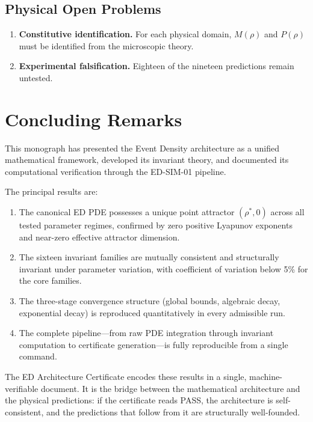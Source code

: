 \documentclass[11pt,twoside,openright]{book}
\theoremstyle{definition}
\theoremstyle{plain}
\theoremstyle{definition}
\theoremstyle{remark}
\newcommand{\rhostar}{\rho^{*}}
\begin{document}
\section{Physical Open Problems}

\begin{enumerate}[resume]
\item \textbf{Constitutive identification.} For each physical domain, \(M(\rho)\) and \(P(\rho)\) must be identified from the microscopic theory.
\item \textbf{Experimental falsification.} Eighteen of the nineteen predictions remain untested.
\end{enumerate}


\chapter{Concluding Remarks}\label{ch:conclusion}

This monograph has presented the Event Density architecture as a unified mathematical framework, developed its invariant theory, and documented its computational verification through the ED-SIM-01 pipeline.

The principal results are:
\begin{enumerate}
\item The canonical ED PDE possesses a unique point attractor \((\rhostar, 0)\) across all tested parameter regimes, confirmed by zero positive Lyapunov exponents and near-zero effective attractor dimension.
\item The sixteen invariant families are mutually consistent and structurally invariant under parameter variation, with coefficient of variation below 5\% for the core families.
\item The three-stage convergence structure (global bounds, algebraic decay, exponential decay) is reproduced quantitatively in every admissible run.
\item The complete pipeline---from raw PDE integration through invariant computation to certificate generation---is fully reproducible from a single command.
\end{enumerate}

The ED Architecture Certificate encodes these results in a single, machine-verifiable document. It is the bridge between the mathematical architecture and the physical predictions: if the certificate reads PASS, the architecture is self-consistent, and the predictions that follow from it are structurally well-founded.
\end{document}
